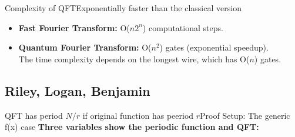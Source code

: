 {\begin{frame}{Complexity of QFT}{Exponentially faster than the classical version}
\begin{itemize}
    \item \textbf{Fast Fourier Transform:}
    O($n2^{n}$) computational steps. \\
    \item \textbf{Quantum Fourier Transform:}
    O($n^{2}$) gates (exponential speedup). \\
    The time complexity depends on the longest wire, which has O($n$) gates. \\
    \Vskip{-1.5 em}
    
\end{itemize}
\end{frame}


\subsection*{Riley, Logan, Benjamin}

\begin{frame}{QFT has period $N/r$ if original function has peeriod $r$}{Proof Setup: The generic f(x) case}
\Vskip{-3em}%
%
\textbf{Three variables show the periodic function and QFT:}
\Vskip{-1.5em}\begin{description}
    


\end{description}
\end{frame}}
